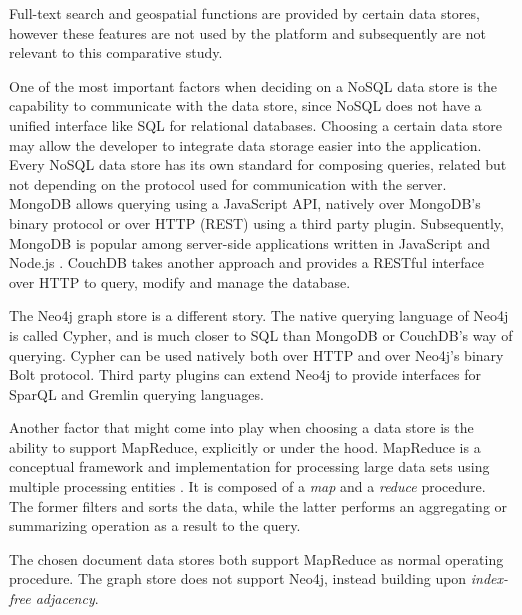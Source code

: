 Full-text search and geospatial functions are provided by certain data stores, however these features are not used by the platform and subsequently are not relevant to this comparative study.\\


\begin{landscape}
  
\end{landscape}

One of the most important factors when deciding on a NoSQL data store is the capability to communicate with the data store, since NoSQL does not have a unified interface like SQL for relational databases.
Choosing a certain data store may allow the developer to integrate data storage easier into the application.
Every NoSQL data store has its own standard for composing queries, related but not depending on the protocol used for communication with the server.
MongoDB allows querying using a JavaScript API, natively over MongoDB's binary protocol or over HTTP (REST) using a third party plugin.
Subsequently, MongoDB is popular among server-side applications written in JavaScript and Node.js \autocite{Dayley2014}.
CouchDB takes another approach and provides a RESTful interface over HTTP to query, modify and manage the database.

The Neo4j graph store is a different story.
The native querying language of Neo4j is called Cypher, and is much closer to SQL than MongoDB or CouchDB's way of querying.
Cypher can be used natively both over HTTP and over Neo4j's binary Bolt protocol.
Third party plugins can extend Neo4j to provide interfaces for SparQL and Gremlin querying languages.

Another factor that might come into play when choosing a data store is the ability to support MapReduce, explicitly or under the hood.
MapReduce is a conceptual framework and implementation for processing large data sets using multiple processing entities \autocite{Dean2008}.
It is composed of a \textit{map} and a \textit{reduce} procedure.
The former filters and sorts the data, while the latter performs an aggregating or summarizing operation as a result to the query.

The chosen document data stores both support MapReduce as normal operating procedure.
The graph store does not support Neo4j, instead building upon \textit{index-free adjacency}.

